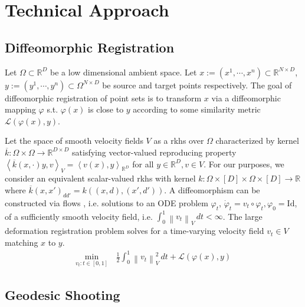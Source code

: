 \documentclass{6838publ}
\newcommand\sL{\ensuremath{\mathcal{L}}}
\newcommand\R{\ensuremath{\mathbb{R}}} %
\newcommand{\norm}[1]{\left\lVert#1\right\rVert}
\newcommand\inner[2]{\ensuremath{\left< #1, #2 \right>}} %
\begin{document}


\section{Technical Approach}\label{sec:technical_approach}


\subsection{Diffeomorphic Registration}


Let $\Omega \subset\R^D$ be a low dimensional ambient space. Let $x := (x^1,\cdots,x^n)\subset \R^{N\times D}$, $y := (y^1,\cdots,y^n)\subset\Omega^{N\times D}$ be source and target points respectively. The goal of diffeomorphic registration of point sets is to transform $x$ via a diffeomorphic mapping $\varphi$ s.t. $\varphi(x)$ is close to $y$ according to some similarity metric $\sL(\varphi(x),y)$.


Let the space of smooth velocity fields $V$ as a rkhs over $\Omega$ characterized by kernel $\overline{k}:\Omega\times\Omega\to\R^{D\times D}$ satisfying vector-valued reproducing property $\inner{\overline{k}(x,\cdot)y}{v}_{V} = \inner{v(x)}{y}_{\R^D}$ for all $y\in\R^D, v\in V$. For our purposes, we consider an equivalent scalar-valued rkhs with kernel $k:\Omega\times[D]\times\Omega\times[D] \to\R$ where $\overline{k}(x,x')_{dd'} = k((x,d),(x',d'))$. A diffeomorphism can be constructed via flows , i.e. solutions to an ODE problem $\varphi_t$, $\dot{\varphi}_t = v_t\circ \varphi_t, \varphi_0 = \text{Id}$, of a sufficiently smooth velocity field, i.e. $\int_0^1 \norm{v_t}_V\, dt<\infty$. The large deformation registration problem solves for a time-varying velocity field $v_t\in V$ matching $x$ to $y$.
\begin{align}
    \min_{v_t:t\in [0,1]} \,
        &\frac{1}{2} \int_0^1 \norm{v_t}_V^2 \, dt + \sL(\varphi(x),y)
\end{align}

\subsection{Geodesic Shooting}
\end{document}
